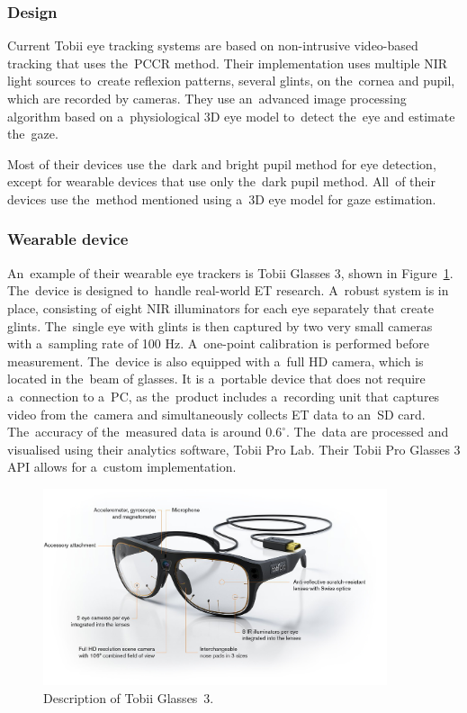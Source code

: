 \subsubsection*{Design}
Current Tobii eye tracking systems are based on non-intrusive video-based tracking that uses the~PCCR method. Their implementation uses multiple NIR light sources to~create reflexion patterns, several glints, on the~cornea and pupil, which are recorded by cameras. They use an~advanced image processing algorithm based on a~physiological 3D eye model to~detect the~eye and estimate the~gaze.~\cite{tobii-eye-trackers}

Most of their devices use the~dark and bright pupil method for eye detection, except for wearable devices that use only the~dark pupil method. All~of their devices use the~method mentioned using a~3D eye model for gaze estimation.~\cite{tobii-dark-pupil}

\subsubsection*{Wearable device}
An~example of their wearable eye trackers is Tobii Glasses 3, shown in Figure~\ref{fig:tobii-glasses3}. The~device is designed to~handle real-world ET research. A~robust system is in place, consisting of eight NIR illuminators for each eye separately that create glints. The~single eye with glints is then captured by two very small cameras with a~sampling rate of 100 Hz. A~one-point calibration is performed before measurement. The~device is also equipped with a~full HD camera, which is located in the~beam of glasses. It is a~portable device that does not require a~connection to a~PC, as the~product includes a~recording unit that captures video from the~camera and simultaneously collects ET data to an~SD card. The~accuracy of the~measured data is around $0.6^{\circ}$. The~data are processed and visualised using their analytics software, Tobii Pro Lab. Their Tobii Pro Glasses 3 API allows for a~custom implementation.~\cite{tobii-glasses3}

\begin{figure}\centering
    \includegraphics[width=0.9\textwidth]{img/TobiiGlasses3.jpg}
    \caption[Description of Tobii Glasses 3.]{Description of Tobii Glasses~3.~\cite{tobii-glasses3-image}}
    \label{fig:tobii-glasses3}
\end{figure}

